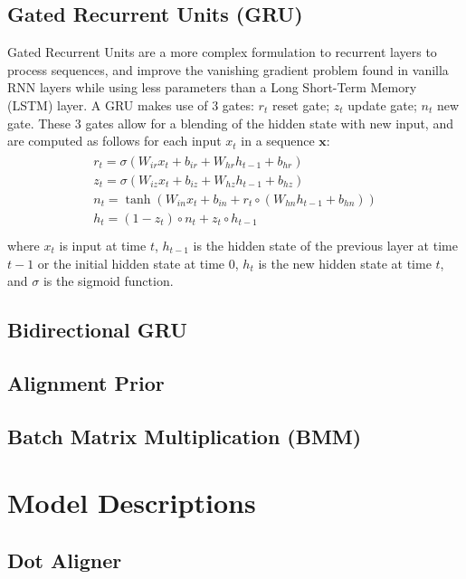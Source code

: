 \documentclass[twoside,twocolumn]{article}
\renewcommand{\vec}[1]{\mathbf{#1}}
\begin{document}
\subsection{Gated Recurrent Units (GRU)}
Gated Recurrent Units are a more complex formulation to recurrent layers to process sequences, and improve the vanishing gradient problem found in vanilla RNN layers while using less parameters than a Long Short-Term Memory (LSTM) layer\cite{grupaper}. A GRU makes use of 3 gates: $r_t$ reset gate; $z_t$ update gate; $n_t$ new gate. These 3 gates allow for a blending of the hidden state with new input, and are computed as follows for each input $x_t$ in a sequence $\vec{x}$:
\begin{equation}
  \begin{split}\begin{array}{ll}
  r_t = \sigma(W_{ir} x_t + b_{ir} + W_{hr} h_{t-1} + b_{hr}) \\
  z_t = \sigma(W_{iz} x_t + b_{iz} + W_{hz} h_{t-1} + b_{hz}) \\
  n_t = \tanh(W_{in} x_t + b_{in} + r_t \circ (W_{hn} h_{t-1}+ b_{hn})) \\
  h_t = (1 - z_t) \circ n_t + z_t \circ h_{t-1} \\
  \end{array}\end{split}
\end{equation}
where $x_t$ is input at time $t$, $h_{t-1}$ is the hidden state of the previous layer at time $t-1$ or the initial hidden state at time $0$, $h_t$ is the new hidden state at time $t$, and $\sigma$ is the sigmoid function.
\subsection{Bidirectional GRU}
\subsection{Alignment Prior}
\subsection{Batch Matrix Multiplication (BMM)}

\section{Model Descriptions}
\subsection{Dot Aligner}
\end{document}

